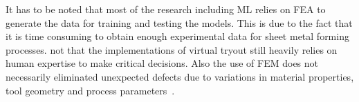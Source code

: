 It has to be noted that most of the research including \ac{ML} relies on FEA to
generate the data for training and testing the models.
This is due to the fact that it is time consuming to obtain enough experimental data for
sheet metal forming processes.
\cite{dib_singleensembleclassifiers_2020} not that the implementations of virtual
tryout still heavily relies on human expertise to make critical decisions.
Also the use of FEM does not necessarily eliminated unexpected defects due to variations
in material properties, tool geometry and process parameters~\cite[p. 2]{
    dib_singleensembleclassifiers_2020}.








